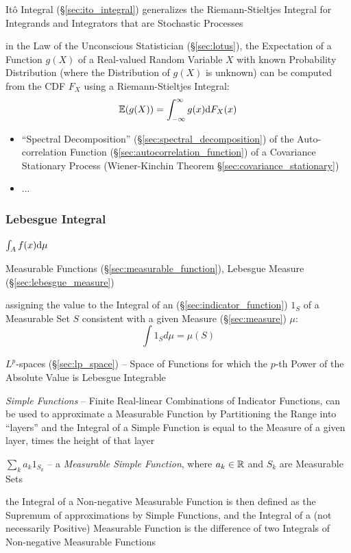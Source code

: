 {\fist It\^o Integral (\S\ref{sec:ito_integral}) generalizes the
Riemann-Stieltjes Integral for Integrands and Integrators that are Stochastic
Processes

in the Law of the Unconscious Statistician (\S\ref{sec:lotus}), the Expectation
of a Function $g(X)$ of a Real-valued Random Variable $X$ with known Probability
Distribution (where the Distribution of $g(X)$ is unknown) can be computed from
the CDF $F_X$ using a Riemann-Stieltjes Integral:
\[
  \mathbb{E}(g(X)) = \int_{-\infty}^\infty g(x) \mathrm{d}F_X(x)
\]

\begin{itemize}
  \item ``Spectral Decomposition'' (\S\ref{sec:spectral_decomposition}) of the
    Auto-correlation Function (\S\ref{sec:autocorrelation_function}) of a
    Covariance Stationary Process (Wiener-Kinchin Theorem
    \S\ref{sec:covariance_stationary})
  \item ...
\end{itemize}



\subsubsection{Lebesgue Integral}\label{sec:lebesgue_integral}

$\int_A f(x) \mathrm{d}\mu$

Measurable Functions (\S\ref{sec:measurable_function}), Lebesgue Measure
(\S\ref{sec:lebesgue_measure})

assigning the value to the Integral of an (\S\ref{sec:indicator_function}) $1_S$
of a Measurable Set $S$ consistent with a given Measure (\S\ref{sec:measure})
$\mu$:
\[
  \int 1_S d\mu = \mu(S)
\]

\fist $L^p$-spaces (\S\ref{sec:lp_space}) -- Space of Functions for which the
$p$-th Power of the Absolute Value is Lebesgue Integrable

\emph{Simple Functions} -- Finite Real-linear Combinations of Indicator
Functions, can be used to approximate a Measurable Function by Partitioning the
Range into ``layers'' and the Integral of a Simple Function is equal to the
Measure of a given layer, times the height of that layer

$\sum_k a_k 1_{S_k}$ -- a \emph{Measurable Simple Function}, where
$a_k \in \mathbb{R}$ and $S_k$ are Measurable Sets

the Integral of a Non-negative Measurable Function is then defined as the
Supremum of approximations by Simple Functions, and the Integral of a (not
necessarily Positive) Measurable Function is the difference of two Integrals of
Non-negative Measurable Functions

}
